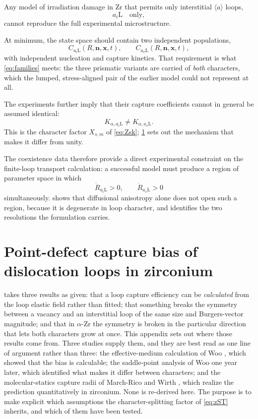 \documentclass{article}
\newcommand{\aloop}{\ensuremath{\langle a\rangle}}
\newcommand{\aiL}{a_{i}\mathrm{L}}
\newcommand{\avL}{a_{v}\mathrm{L}}
\newcommand{\nvec}{\bm n}
\begin{document}
Any model of irradiation damage in Zr that permits only interstitial \aloop{}
loops,
\begin{equation}
    \aiL\quad\text{only},
\end{equation}
cannot reproduce the full experimental microstructure.

At minimum, the state space should contain two independent populations,
\begin{equation}
    \boxed{
    C_{\aiL}(R,\nvec,\bm x,t),
    \qquad
    C_{\avL}(R,\nvec,\bm x,t),
    }
\end{equation}
with independent nucleation and capture kinetics. That requirement is what
\cref{eq:families} meets: the three prismatic variants are carried of \emph{both}
characters, which the lumped, stress-aligned pair of the earlier model could not
represent at all.

The experiments further imply that their capture coefficients cannot in general
be assumed identical:
\begin{equation}
    K_{\alpha,\aiL}
    \neq
    K_{\alpha,\avL}.
\end{equation}
This is the character factor $X_{s,m}$ of \cref{eq:Zsk}; \cref{app:bias}
sets out the mechanism that makes it differ from unity.

The coexistence data therefore provide a direct experimental constraint on the
finite-loop transport calculation: a successful model must produce a region of
parameter space in which
\begin{equation}
    \boxed{
    \dot R_{\aiL}>0,
    \qquad
    \dot R_{\avL}>0
    }
\end{equation}
simultaneously.  shows that diffusional anisotropy alone does
not open such a region, because it is degenerate in loop character, and
identifies the two resolutions the formulation carries.

\section{Point-defect capture bias of dislocation loops in zirconium}
\label{app:bias}

 takes three results as given: that a loop capture efficiency
can be \emph{calculated} from the loop elastic field rather than fitted; that
something breaks the symmetry between a vacancy and an interstitial loop of the
same size and Burgers-vector magnitude; and that in $\alpha$-Zr the symmetry is
broken in the particular direction that lets both characters grow at once. This
appendix sets out where those results come from. Three studies supply them, and
they are best read as one line of argument rather than three: the effective-medium
calculation of Woo \citep{woo1981sink}, which showed that the bias is calculable;
the saddle-point analysis of Woo \citep{woo1982intrinsic} one year later, which
identified what makes it differ between characters; and the molecular-statics
capture radii of March-Rico and Wirth \citep{marchrico2023}, which realize the
prediction quantitatively in zirconium. None is re-derived here. The purpose is
to make explicit which assumptions the character-splitting factor of
\cref{eq:zST} inherits, and which of them have been tested.
\end{document}
